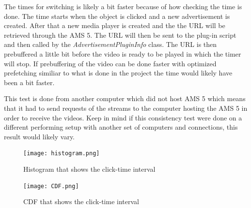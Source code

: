 The times for switching is likely a bit faster because of how checking the time is done. The time starts when the object is clicked and a new advertisement is created. After that a new media player is created and the the URL will be retrieved through the AMS 5. The URL will then be sent to the plug-in script and then called by the \textit{AdvertisementPluginInfo} class. The URL is then prebuffered a little bit before the video is ready to be played in which the timer will stop. If prebuffering of the video can be done faster with optimized prefetching similiar to what is done in the project \cite{optimizedstreaming} the time would likely have been a bit faster.

This test is done from another computer which did not host AMS 5 which means that it had to send requests of the streams to the computer hosting the AMS 5 in order to receive the videos. Keep in mind if this consistency test were done on a different performing setup with another set of computers and connections, this result would likely vary.

\begin{figure}[ht!]
\begin{center}
	\texttt{[image: histogram.png]}
	\caption{Histogram that shows the click-time interval}
	\label{fig:histogram}
\end{center}
\end{figure}

\begin{figure}[ht!]
\begin{center}
	\texttt{[image: CDF.png]}
	\caption{CDF that shows the click-time interval}
	\label{fig:cdf}
\end{center}
\end{figure}